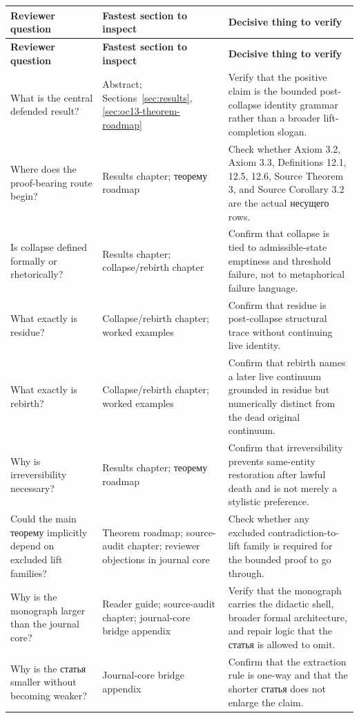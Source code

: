 \begin{longtable}{p{3.4cm} p{4.4cm} p{5.7cm}}
\toprule
\textbf{Reviewer question} & \textbf{Fastest section to inspect} & \textbf{Decisive thing to verify} \\
\midrule
\endfirsthead
\toprule
\textbf{Reviewer question} & \textbf{Fastest section to inspect} & \textbf{Decisive thing to verify} \\
\midrule
\endhead
\bottomrule
\endfoot
What is the central defended result? & Abstract; Sections~\ref{sec:results}, \ref{sec:oc13-theorem-roadmap} & Verify that the positive claim is the bounded post-collapse identity grammar rather than a broader lift-completion slogan. \\
Where does the proof-bearing route begin? & Results chapter; теорему roadmap & Check whether Axiom 3.2, Axiom 3.3, Definitions 12.1, 12.5, 12.6, Source Theorem 3, and Source Corollary 3.2 are the actual несущего rows. \\
Is collapse defined formally or rhetorically? & Results chapter; collapse/rebirth chapter & Confirm that collapse is tied to admissible-state emptiness and threshold failure, not to metaphorical failure language. \\
What exactly is residue? & Collapse/rebirth chapter; worked examples & Confirm that residue is post-collapse structural trace without continuing live identity. \\
What exactly is rebirth? & Collapse/rebirth chapter; worked examples & Confirm that rebirth names a later live continuum grounded in residue but numerically distinct from the dead original continuum. \\
Why is irreversibility necessary? & Results chapter; теорему roadmap & Confirm that irreversibility prevents same-entity restoration after lawful death and is not merely a stylistic preference. \\
Could the main теорему implicitly depend on excluded lift families? & Theorem roadmap; source-audit chapter; reviewer objections in journal core & Check whether any excluded contradiction-to-lift family is required for the bounded proof to go through. \\
Why is the monograph larger than the journal core? & Reader guide; source-audit chapter; journal-core bridge appendix & Verify that the monograph carries the didactic shell, broader formal architecture, and repair logic that the статья is allowed to omit. \\
Why is the статья smaller without becoming weaker? & Journal-core bridge appendix & Confirm that the extraction rule is one-way and that the shorter статья does not enlarge the claim. \\

\end{longtable}
